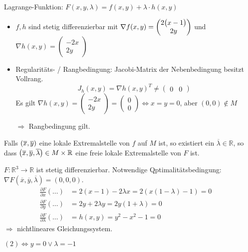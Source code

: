 \documentclass{scrreprt}
\begin{document}
Lagrange-Funktion: $F(x, y, \lambda) = f(x, y) + \lambda \cdot h(x, y)$
\begin{itemize}
\item $f, h$ sind stetig differenzierbar mit $\nabla f(x, y) = \begin{pmatrix}
    2 \qty\big(x - 1) \\
    2 y
  \end{pmatrix}$ und $\nabla h(x, y) = \begin{pmatrix}
    -2 x \\
    2 y
  \end{pmatrix}$
\item Regularitäts- / Rangbedingung: Jacobi-Matrix der Nebenbedingung besitzt Vollrang.
  \[
    J_h(x, y) = \nabla h(x, y)^T \ne \begin{pmatrix}0 & 0\end{pmatrix}
  \]
  Es gilt $\nabla h(x, y) = \begin{pmatrix}-2x \\ 2y \end{pmatrix} =
  \begin{pmatrix}0 \\ 0\end{pmatrix} \iff x = y = 0$, aber $(0, 0) \notin M$

  $\Rightarrow$ Rangbedingung gilt.
\end{itemize}

Falls $\qty(\overline{x}, \overline{y})$ eine lokale Extremalstelle von $f$ auf
$M$ ist, so existiert ein $\overline{\lambda} \in \mathbb{R}$, so dass
$\qty(\overline{x}, \overline{y}, \overline{\lambda}) \in M \times \mathbb{R}$
eine freie lokale Extremalstelle von $F$ ist.

$F \colon \mathbb{R}^3 \to \mathbb{R}$ ist stetig differenzierbar.
Notwendige Qptimalitätsbedingung:
$\nabla F(\overline{x}, \overline{y}, \overline{\lambda}) = (0, 0, 0)$.
\setcounter{section}{1}
\begin{align}
  \frac{\partial F}{\partial x} (\ldots) &= 2(x - 1) - 2 \lambda x
  = 2(x(1 - \lambda) - 1) = 0 & \label{eq:1-1} \\
  \frac{\partial F}{\partial y} (\ldots) &= 2y + 2\lambda y = 2y(1 + \lambda) = 0 \label{eq:1-2} \\
  \frac{\partial F}{\partial \lambda} (\ldots) &= h(x, y) = y^2 - x^2 - 1 = 0 \label{eq:1-3}
\end{align}
$\Rightarrow$ nichtlineares Gleichungssystem.

$\hyperref[eq:1-2]{(2)} \iff y = 0 \lor \lambda = -1$
\end{document}
